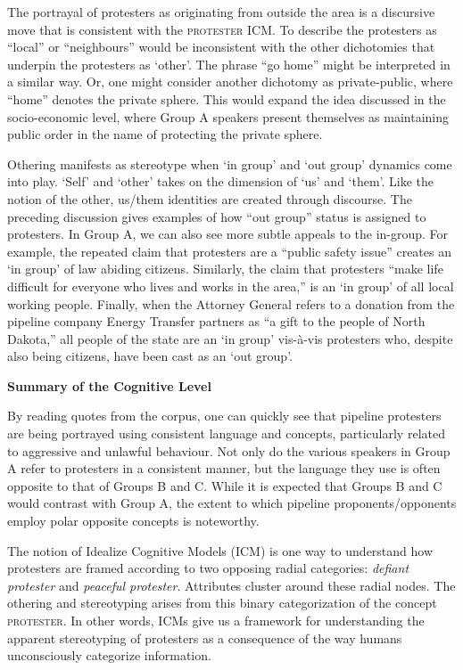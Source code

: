 The portrayal of protesters as originating from outside the area is a discursive move that is consistent with the \textsc{protester} ICM. To describe the protesters as ``local'' or ``neighbours'' would be inconsistent with the other dichotomies that underpin the protesters as `other'. The phrase ``go home'' might be interpreted in a similar way. Or, one might consider another dichotomy as private-public, where ``home'' denotes the private sphere. This would expand the idea discussed in the socio-economic level, where Group A speakers present themselves as maintaining public order in the name of protecting the private sphere.

Othering manifests as stereotype when `in group' and `out group' dynamics come into play. `Self' and `other' takes on the dimension of `us' and `them'. Like the notion of the other, us/them identities are created through discourse. The preceding discussion gives examples of how ``out group'' status is assigned to protesters. In Group A, we can also see more subtle appeals to the in-group. For example, the repeated claim that protesters are a ``public safety issue'' creates an `in group' of law abiding citizens. Similarly, the claim that protesters ``make life difficult for everyone who lives and works in the area,'' is an `in group' of all local working people. Finally, when the Attorney General refers to a donation from the pipeline company Energy Transfer partners as ``a gift to the people of North Dakota,'' all people of the state are an `in group' vis-\`a-vis protesters who, despite also being citizens, have been cast as an `out group'.      

\textbf{Summary of the Cognitive Level}

By reading quotes from the corpus, one can quickly see that pipeline protesters are being portrayed using consistent language and concepts, particularly related to aggressive and unlawful behaviour. Not only do the various speakers in Group A refer to protesters in a consistent manner, but the language they use is often opposite to that of Groups B and C. While it is expected that Groups B and C would contrast with Group A, the extent to which pipeline proponents/opponents employ polar opposite concepts is noteworthy. 

The notion of Idealize Cognitive Models (ICM) is one way to understand how protesters are framed according to two opposing radial categories: \textit{defiant protester} and \textit{peaceful protester}. Attributes cluster around these radial nodes. The othering and stereotyping arises from this binary categorization of the concept \textsc{protester}. In other words, ICMs give us a framework for understanding the apparent stereotyping of protesters as a consequence of the way humans unconsciously categorize information.

